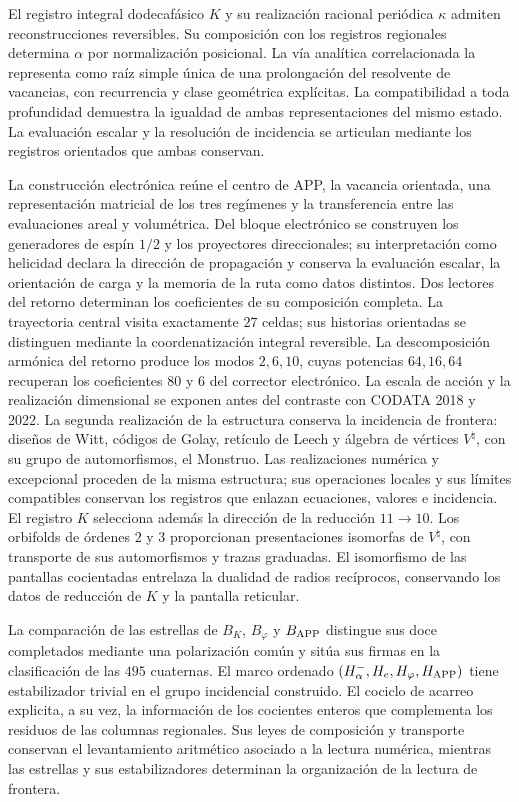 El registro integral dodecafásico \(K\) y su realización racional periódica
\(\kappa\) admiten reconstrucciones reversibles. Su composición con los registros
regionales determina \(\alpha\) por normalización posicional. La vía analítica
correlacionada la representa como raíz simple única de una prolongación
del resolvente de vacancias, con recurrencia y clase geométrica explícitas.
La compatibilidad a toda profundidad demuestra la igualdad de ambas
representaciones del mismo estado. La evaluación escalar y la resolución de incidencia
se articulan mediante los registros orientados que ambas conservan.

La construcción electrónica reúne el centro de APP, la vacancia orientada,
una representación matricial de los tres regímenes y la transferencia entre
las evaluaciones areal y volumétrica. Del bloque electrónico se construyen
los generadores de espín \(1/2\) y los proyectores direccionales; su interpretación
como helicidad declara la dirección de propagación y conserva la evaluación
escalar, la orientación de carga y la memoria de la ruta como datos distintos.
Dos lectores del retorno determinan
los coeficientes de su composición completa. La trayectoria central visita
exactamente \(27\) celdas; sus historias orientadas se distinguen mediante
la coordenatización integral reversible. La descomposición armónica del retorno
produce los modos \(2,6,10\), cuyas potencias \(64,16,64\) recuperan
los coeficientes \(80\) y \(6\) del corrector electrónico.
La escala de acción y la
realización dimensional se exponen antes del contraste con CODATA 2018 y
2022. La segunda realización de la estructura conserva la incidencia de
frontera: diseños de Witt, códigos de Golay, retículo de Leech y álgebra
de vértices \(V^\natural\), con su grupo de automorfismos, el Monstruo.
Las realizaciones numérica y excepcional proceden de la misma estructura;
sus operaciones locales y sus límites compatibles conservan los registros
que enlazan ecuaciones, valores e incidencia.
El registro \(K\) selecciona además la dirección de la reducción
\(11\to10\). Los orbifolds de órdenes \(2\) y \(3\) proporcionan
presentaciones isomorfas de \(V^\natural\), con transporte de sus
automorfismos y trazas graduadas. El isomorfismo de las pantallas
cocientadas entrelaza la dualidad de radios recíprocos, conservando
los datos de reducción de \(K\) y la pantalla reticular.

La comparación de las estrellas de \(B_K\), \(B_\varphi\) y
\(B_{\rm APP}\) distingue sus doce completados mediante una polarización
común y sitúa sus firmas en la clasificación de las \(495\) cuaternas.
El marco ordenado \((H^-_\alpha,H_e,H_\varphi,H_{\rm APP})\) tiene
estabilizador trivial en el grupo incidencial construido. El cociclo
de acarreo explicita, a su vez, la información de los cocientes enteros
que complementa los residuos de las columnas regionales. Sus leyes de
composición y transporte conservan el levantamiento aritmético asociado
a la lectura numérica, mientras las estrellas y sus estabilizadores
determinan la organización de la lectura de frontera.

